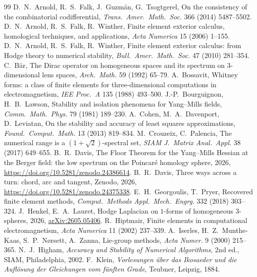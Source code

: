 \documentclass[11pt]{article}
\theoremstyle{definition}
\theoremstyle{remark}
\begin{document}
\begin{thebibliography}{99}\small
{} D.~N.~Arnold, R.~S.~Falk, J.~Guzm\'an, G.~Tsogtgerel, On the consistency of the combinatorial codifferential, \emph{Trans.\ Amer.\ Math.\ Soc.} 366 (2014) 5487--5502.
 D.~N.~Arnold, R.~S.~Falk, R.~Winther, Finite element exterior calculus, homological techniques, and applications, \emph{Acta Numerica} 15 (2006) 1--155.
 D.~N.~Arnold, R.~S.~Falk, R.~Winther, Finite element exterior calculus: from Hodge theory to numerical stability, \emph{Bull.\ Amer.\ Math.\ Soc.} 47 (2010) 281--354.
 C.~B\"ar, The Dirac operator on homogeneous spaces and its spectrum on $3$-dimensional lens spaces, \emph{Arch.\ Math.} 59 (1992) 65--79.
 A.~Bossavit, Whitney forms: a class of finite elements for three-dimensional computations in electromagnetism, \emph{IEE Proc.\ A} 135 (1988) 493--500.
 J.-P.~Bourguignon, H.~B.~Lawson, Stability and isolation phenomena for Yang--Mills fields, \emph{Comm.\ Math.\ Phys.} 79 (1981) 189--230.
 A.~Cohen, M.~A.~Davenport, D.~Leviatan, On the stability and accuracy of least squares approximations, \emph{Found.\ Comput.\ Math.} 13 (2013) 819--834.
 M.~Crouzeix, C.~Palencia, The numerical range is a $(1+\sqrt2)$-spectral set, \emph{SIAM J.\ Matrix Anal.\ Appl.} 38 (2017) 649--655.
 B.~R.~Davis, The Floor Theorem for the Yang--Mills Hessian at the Berger field: the low spectrum on the Poincar\'e homology sphere, 2026, \url{https://doi.org/10.5281/zenodo.24386614}.
 B.~R.~Davis, Three ways across a turn: chord, arc and tangent, Zenodo,
2026, \url{https://doi.org/10.5281/zenodo.24375338}.
 E.~H.~Georgoulis, T.~Pryer, Recovered finite element methods, \emph{Comput.\ Methods Appl.\ Mech.\ Engrg.} 332 (2018) 303--324.
 J.~Henkel, E.~A.~Lauret, Hodge Laplacian on $1$-forms of homogeneous $3$-spheres, 2026, \href{https://arxiv.org/abs/2605.05406}{arXiv:2605.05406}.
 R.~Hiptmair, Finite elements in computational electromagnetism, \emph{Acta Numerica} 11 (2002) 237--339.
 A.~Iserles, H.~Z.~Munthe-Kaas, S.~P.~N{\o}rsett, A.~Zanna, Lie-group methods, \emph{Acta Numer.} 9 (2000) 215--365.
 N.~J.~Higham, \emph{Accuracy and Stability of Numerical Algorithms}, 2nd ed., SIAM, Philadelphia, 2002.
 F.~Klein, \emph{Vorlesungen \"uber das Ikosaeder und die Aufl\"osung der Gleichungen vom f\"unften Grade}, Teubner, Leipzig, 1884.

\end{thebibliography}
\end{document}
